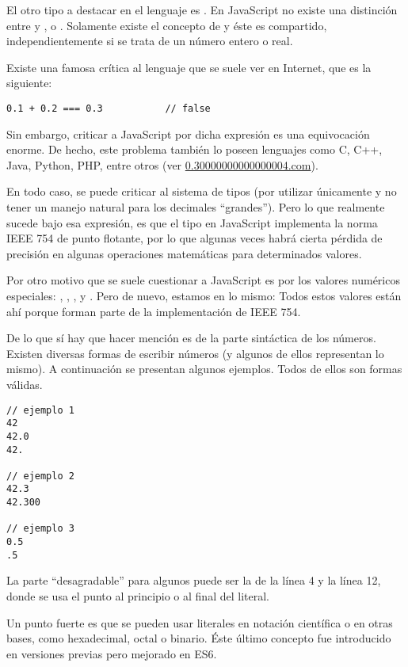 El otro tipo a destacar en el lenguaje es . En JavaScript no existe una distinción entre  y ,  o . Solamente existe el concepto de  y éste es compartido, independientemente si se trata de un número entero o real.

Existe una famosa crítica al lenguaje que se suele ver en Internet, que es la siguiente:

\begin{lstlisting}
0.1 + 0.2 === 0.3			// false
\end{lstlisting}

Sin embargo, criticar a JavaScript por dicha expresión es una equivocación enorme. De hecho, este problema también lo poseen lenguajes como C, C++, Java, Python, PHP, entre otros (ver \href{https://0.30000000000000004.com/}{0.30000000000000004.com}). 

En todo caso, se puede criticar al sistema de tipos (por utilizar únicamente  y no tener un manejo natural para los decimales "`grandes"'). Pero lo que realmente sucede bajo esa expresión, es que el tipo  en JavaScript implementa la norma IEEE 754 de punto flotante, por lo que algunas veces habrá cierta pérdida de precisión en algunas operaciones matemáticas para determinados valores. 

Por otro motivo que se suele cuestionar a JavaScript es por los valores numéricos especiales: , , ,  y . Pero de nuevo, estamos en lo mismo: Todos estos valores están ahí porque forman parte de la implementación de IEEE 754.

De lo que sí hay que hacer mención es de la parte sintáctica de los números. Existen diversas formas de escribir números (y algunos de ellos representan lo mismo). A continuación se presentan algunos ejemplos. Todos de ellos son formas válidas.

\begin{lstlisting}
// ejemplo 1
42
42.0
42.

// ejemplo 2
42.3
42.300

// ejemplo 3
0.5
.5
\end{lstlisting}

La parte "`desagradable"' para algunos puede ser la de la línea 4 y la línea 12, donde se usa el punto al principio o al final del literal. 

Un punto fuerte es que se pueden usar literales en notación científica o en otras bases, como hexadecimal, octal o binario. Éste último concepto fue introducido en versiones previas pero mejorado en ES6.

